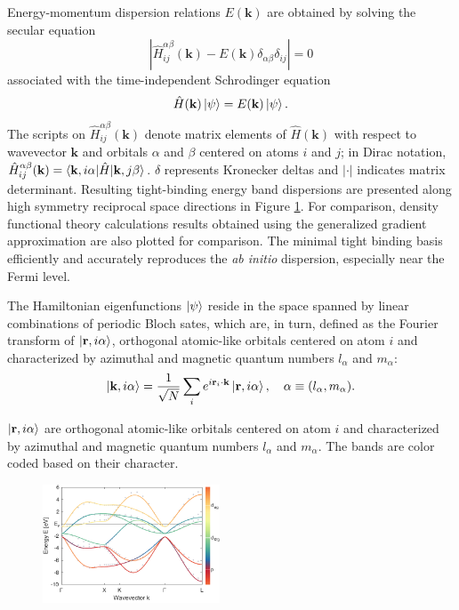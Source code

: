 \documentclass[twocolumn,showpacs,preprintnumbers,superscriptaddress,prb,floatfix,aps,10pt]{revtex4-1}
\renewcommand{\vec}[1]{\ensuremath{\mathbf{#1}}}
\newcommand*{\ham}{\hat{H}}
\newcommand*{\bloch}{\ket{\vec{k}, i\alpha}}
\newcommand*{\lowdin}{\ket{\vec{r}, i\alpha}}
\begin{document}
Energy-momentum dispersion relations $E(\vec{k})$ are obtained by solving the secular equation
\begin{equation}
\label{eq:secular}
\left| \ham^{\alpha\beta}_{ij}(\vec{k}) - E(\vec{k})\delta_{\alpha\beta}\delta_{ij} \right| = 0
\end{equation}
%
associated with the time-independent Schrodinger equation 
%
\begin{equation}
\label{eq:schrodinger}
\hat{H}(\vec{k}) \ket{\psi} = E(\vec{k}) \ket{\psi}.
\end{equation}
%
The scripts on $\ham^{\alpha\beta}_{ij}(\vec{k})$ denote matrix elements of $\ham(\vec{k})$ with respect to wavevector $\vec{k}$ and orbitals $\alpha$ and $\beta$ centered on atoms $i$ and $j$; in Dirac notation, $\ham^{\alpha\beta}_{ij}(\vec{k}) = \braket{\vec{k},i\alpha | \ham | \vec{k},j\beta}$. $\delta$ represents Kronecker deltas and $|\cdot |$ indicates matrix determinant. Resulting tight-binding energy band dispersions are presented along high symmetry reciprocal space directions in Figure \ref{fig:dispersion}. For comparison, density functional theory calculations results obtained using the generalized gradient approximation are also plotted for comparison. The minimal tight binding basis efficiently and accurately reproduces the \emph{ab initio} dispersion, especially near the Fermi level. 

The Hamiltonian eigenfunctions $\ket{\psi}$ reside in the space spanned by linear combinations of periodic Bloch sates, which are, in turn, defined as the Fourier transform of $\lowdin$, orthogonal atomic-like orbitals centered on atom $i$ and characterized by azimuthal and magnetic quantum numbers $l_\alpha$ and $m_\alpha$: 
\begin{equation}
\label{eq:bloch}
\bloch = \frac{1}{\sqrt{N}} \sum_i e^{i\vec{r}_i\cdot\vec{k}} \lowdin, 
\quad
\alpha \equiv (l_\alpha,m_\alpha).
\end{equation}
%

$\lowdin$ are orthogonal atomic-like orbitals centered on atom $i$ and characterized by azimuthal and magnetic quantum numbers $l_\alpha$ and $m_\alpha$. 
The bands are color coded based on their character. 
%
\begin{figure}[h]
\includegraphics[width=0.47\textwidth]{Figure_1_bands.pdf}
\caption[LRC circuit response.]{\label{fig:dispersion} }
\end{figure}
\end{document}

